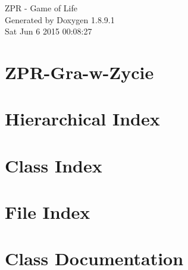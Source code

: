 \documentclass[twoside]{book}
\newcommand{\+}{\discretionary{\mbox{\scriptsize$\hookleftarrow$}}{}{}}
\newcommand{\clearemptydoublepage}{%
  \newpage{\pagestyle{empty}\cleardoublepage}%
}
\begin{document}
\hypersetup{pageanchor=false,
             bookmarks=true,
             bookmarksnumbered=true,
             pdfencoding=unicode
            }
\begin{titlepage}
\vspace*{7cm}
\begin{center}%
{\Large Z\+P\+R -\/ Game of Life }\\
\vspace*{1cm}
{\large Generated by Doxygen 1.8.9.1}\\
\vspace*{0.5cm}
{\small Sat Jun 6 2015 00:08:27}\\
\end{center}
\end{titlepage}
\clearemptydoublepage
\tableofcontents
\clearemptydoublepage
{}
\hypersetup{pageanchor=true}

\chapter{Z\+P\+R-\/\+Gra-\/w-\/\+Zycie}
\label{md__r_e_a_d_m_e}
\hypertarget{md__r_e_a_d_m_e}{}

\chapter{Hierarchical Index}

\chapter{Class Index}

\chapter{File Index}

\chapter{Class Documentation}













































\end{document}
